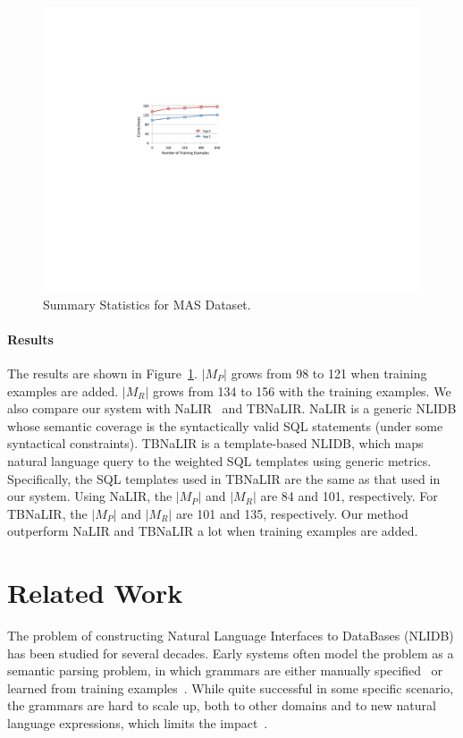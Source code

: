 \documentclass{vldb}
\begin{document}
\begin{figure}
  \center
  \includegraphics[width=0.75\linewidth]{pic/experimentsTraining}
  \caption{Summary Statistics for MAS Dataset.}
  \label{fig:templateMapping}
\end{figure}

\paragraph*{Results}
The results are shown in Figure~\ref{fig:templateMapping}.  $|M_P|$ grows from 98 to 121 when training examples are added.  $|M_R|$ grows from 134 to 156 with the training examples.  We also compare our system with NaLIR~\cite{DBLP:journals/pvldb/LiJ14} and TBNaLIR.  NaLIR is a generic NLIDB whose semantic coverage is the syntactically valid SQL statements (under some syntactical constraints).  TBNaLIR is a template-based NLIDB, which maps natural language query to the weighted SQL templates using generic metrics.  Specifically, the SQL templates used in TBNaLIR are the same as that used in our system.  Using NaLIR, the $|M_P|$ and $|M_R|$ are 84 and 101, respectively.  For TBNaLIR, the $|M_P|$ and $|M_R|$ are 101 and 135, respectively.  Our method outperform NaLIR and TBNaLIR a lot when training examples are added.  

\section{Related Work}
\label{sec:relatedWork}
The problem of constructing Natural Language Interfaces to DataBases (NLIDB) has been studied for several decades.  Early systems often model the problem as a semantic parsing problem, in which grammars are either manually specified~\cite{DBLP:journals/nle/AndroutsopoulosRT95} or learned from training examples~\cite{Zelle:1996:LPD:1864519.1864543,DBLP:conf/ecml/TangM01,DBLP:bibsonomy_ge2005,DBLP:conf/acl/WongM07}.  While quite successful in some specific scenario, the grammars are hard to scale up, both to other domains and to new natural language expressions, which limits the impact~\cite{Liang:2011:LDC:2002472.2002547}.  
\end{document}

